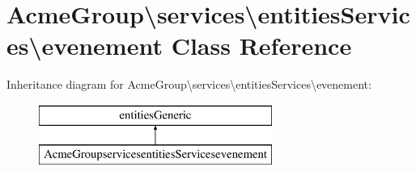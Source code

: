\hypertarget{class_acme_group_1_1services_1_1entities_services_1_1evenement}{\section{Acme\+Group\textbackslash{}services\textbackslash{}entities\+Services\textbackslash{}evenement Class Reference}
\label{class_acme_group_1_1services_1_1entities_services_1_1evenement}
}
Inheritance diagram for Acme\+Group\textbackslash{}services\textbackslash{}entities\+Services\textbackslash{}evenement\+:\begin{figure}[H]
\begin{center}
\leavevmode
\includegraphics[height=2.000000cm]{class_acme_group_1_1services_1_1entities_services_1_1evenement}
\end{center}
\end{figure}
